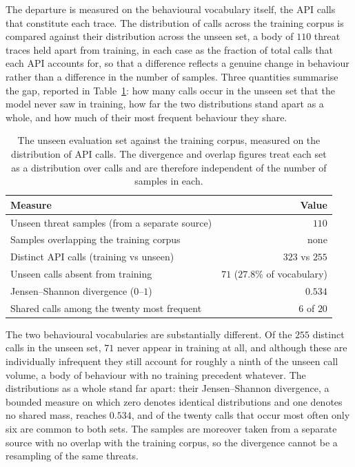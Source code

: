 \documentclass[%
    BCOR=10mm,
    DIV=13,
    toc=bibliography,
    toc=listof,
    oneside,
    12pt,
]{scrbook}
\begin{document}
The departure is measured on the behavioural vocabulary itself, the API calls that
constitute each trace. The distribution of calls across the training corpus is
compared against their distribution across the unseen set, a body of $110$ threat
traces held apart from training, in each case as the fraction of total calls that
each API accounts for, so that a difference reflects a genuine change in behaviour
rather than a difference in the number of samples.
Three quantities summarise the gap, reported in Table~\ref{tab:unseen_shift}: how
many calls occur in the unseen set that the model never saw in training, how far
the two distributions stand apart as a whole, and how much of their most frequent
behaviour they share.

\begin{table}[H]
\centering
\small
\begin{tabular}{@{}lr@{}}
\toprule
\textbf{Measure} & \textbf{Value} \\
\midrule
Unseen threat samples (from a separate source) & $110$ \\
Samples overlapping the training corpus & none \\
Distinct API calls (training vs unseen) & $323$ vs $255$ \\
Unseen calls absent from training & $71$ ($27.8\%$ of vocabulary) \\
Jensen--Shannon divergence ($0$--$1$) & $0.534$ \\
Shared calls among the twenty most frequent & $6$ of $20$ \\
\bottomrule
\end{tabular}
\caption[API distribution shift, training versus unseen]{The unseen evaluation set against the training corpus, measured on the
distribution of API calls. The divergence and overlap figures treat each set as a
distribution over calls and are therefore independent of the number of samples in
each.}
\label{tab:unseen_shift}
\end{table}

The two behavioural vocabularies are substantially different. Of the $255$ distinct
calls in the unseen set, $71$ never appear in training at all, and although these
are individually infrequent they still account for roughly a ninth of the unseen
call volume, a body of behaviour with no training precedent whatever. The
distributions as a whole stand far apart: their Jensen--Shannon divergence, a
bounded measure on which zero denotes identical distributions and one denotes no
shared mass, reaches $0.534$, and of the twenty calls that occur most often only
six are common to both sets. The samples are moreover taken from a separate
source with no overlap with the training corpus, so the divergence cannot be a
resampling of the same threats.
\end{document}
